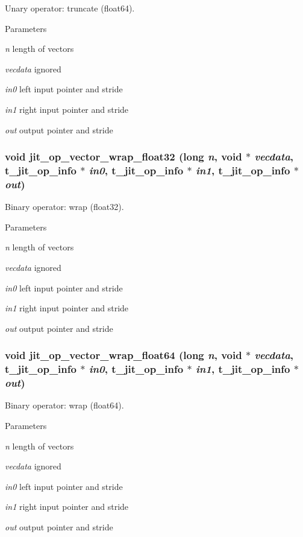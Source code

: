 Unary operator: truncate (float64). 
\begin{DoxyParams}{Parameters}
\item[{\em n}]length of vectors \item[{\em vecdata}]ignored \item[{\em in0}]left input pointer and stride \item[{\em in1}]right input pointer and stride \item[{\em out}]output pointer and stride \end{DoxyParams}
\hypertarget{group__opvecmod_gaddc46d0c5aa910a8e5dc04db16bcbb18}{
\subsubsection[{jit\_\-op\_\-vector\_\-wrap\_\-float32}]{\setlength{\rightskip}{0pt plus 5cm}void jit\_\-op\_\-vector\_\-wrap\_\-float32 (long {\em n}, \/  void $\ast$ {\em vecdata}, \/  {\bf t\_\-jit\_\-op\_\-info} $\ast$ {\em in0}, \/  {\bf t\_\-jit\_\-op\_\-info} $\ast$ {\em in1}, \/  {\bf t\_\-jit\_\-op\_\-info} $\ast$ {\em out})}}
\label{group__opvecmod_gaddc46d0c5aa910a8e5dc04db16bcbb18}


Binary operator: wrap (float32). 
\begin{DoxyParams}{Parameters}
\item[{\em n}]length of vectors \item[{\em vecdata}]ignored \item[{\em in0}]left input pointer and stride \item[{\em in1}]right input pointer and stride \item[{\em out}]output pointer and stride \end{DoxyParams}
\hypertarget{group__opvecmod_gae9bf2d11952a64e18e05b79224cb4041}{
\subsubsection[{jit\_\-op\_\-vector\_\-wrap\_\-float64}]{\setlength{\rightskip}{0pt plus 5cm}void jit\_\-op\_\-vector\_\-wrap\_\-float64 (long {\em n}, \/  void $\ast$ {\em vecdata}, \/  {\bf t\_\-jit\_\-op\_\-info} $\ast$ {\em in0}, \/  {\bf t\_\-jit\_\-op\_\-info} $\ast$ {\em in1}, \/  {\bf t\_\-jit\_\-op\_\-info} $\ast$ {\em out})}}
\label{group__opvecmod_gae9bf2d11952a64e18e05b79224cb4041}


Binary operator: wrap (float64). 
\begin{DoxyParams}{Parameters}
\item[{\em n}]length of vectors \item[{\em vecdata}]ignored \item[{\em in0}]left input pointer and stride \item[{\em in1}]right input pointer and stride \item[{\em out}]output pointer and stride \end{DoxyParams}
